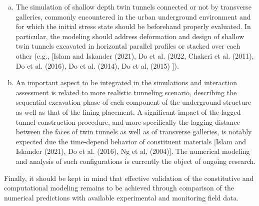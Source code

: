 \documentclass[a4paper,fleqn]{cas-sc}
\begin{document}
\begin{enumerate}[(a)]
	
	\item The simulation of shallow depth twin tunnels connected or not by transverse galleries, commonly encountered in the urban underground environment and for which the initial stress state should be beforehand properly evaluated. In particular, the modeling should address deformation and design of shallow twin tunnels excavated in horizontal parallel profiles or stacked over each other (e.g., [Islam and Iskander (2021), Do et al. (2022, Chakeri et al. (2011),  Do et al. (2016), Do et al. (2014), Do et al, (2015) ]).
	
	\item An important aspect to be integrated in the simulations and interaction assessment is related to more realistic tunneling scenario, describing the sequential excavation phase of each component of the underground structure as well as that of the lining placement. A significant impact of the lagged tunnel construction procedure, and more specifically the lagging distance between the faces of twin tunnels as well as of transverse galleries, is notably expected due the time-depend behavior of constituent materials [Islam and Iskander (2021), Do et al. (2016), Ng et al, (2004)]. The numerical modeling and analysis of such configurations is currently the object of ongoing research.
	
\end{enumerate}

Finally, it should be kept in mind that effective validation of the constitutive and computational modeling remains to be achieved through comparison of the numerical predictions with available experimental and monitoring field data.

%

%
%

%
%
\end{document}
